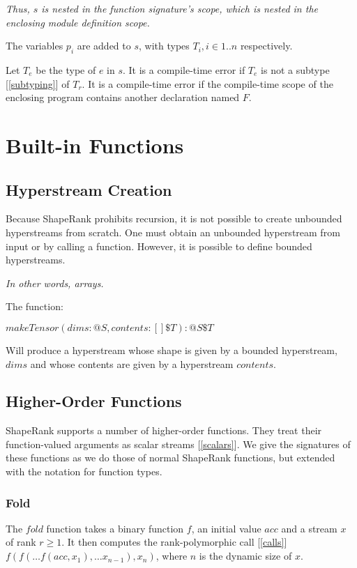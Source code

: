 \documentclass{article}
\begin{document}
{\em Thus, $s$ is nested in the function signature's scope, which is nested in the enclosing module definition scope.}

The variables $p_i$ are added to $s$, with types $T_i, i \in 1..n$ respectively.

Let $T_e$ be the type of $e$ in $s$. 
It is a compile-time error if  $T_e$ is not a subtype [\ref{subtyping}] of $T_r$.  It is a compile-time error if the compile-time scope of the enclosing program contains another declaration named $F$.

\section{Built-in Functions}
\label{builtinFunctions}

\subsection{Hyperstream Creation}
\label{streamCreation}

Because ShapeRank prohibits recursion, it is not possible to create unbounded hyperstreams from scratch. One must obtain an unbounded hyperstream from input or by calling a function.
However, it is possible to define bounded hyperstreams.

{\em In other words, arrays.}

The function:

$makeTensor(dims: @S, contents: []\$T):@S \$T$

Will produce a hyperstream whose shape is given by a bounded hyperstream, $dims$ and whose contents are given by a hyperstream $contents$.

\subsection{Higher-Order Functions}
\label{higherOrderFunctions}

ShapeRank supports a number of higher-order functions. They treat their function-valued arguments as scalar streams [\ref{scalars}]. We give the signatures of these functions as we do those of normal ShapeRank functions, but extended with the notation for function types.


\subsubsection{Fold}
\label{fold}


The $fold$ function takes a binary function $f$, an initial value $acc$ and a stream $x$ of rank $r \ge 1$. It then computes the rank-polymorphic call [\ref{calls}]
$f(f( \ldots f(acc, x_1), \ldots x_{n-1}), x_n)$, where $n$ is the dynamic size of $x$.
\end{document}
